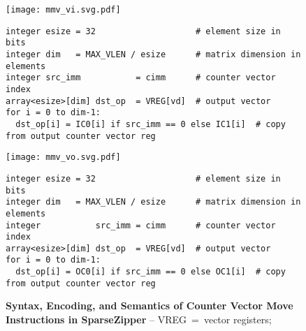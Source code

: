 \lstset{style=python-style}

\begin{figure*}[tp]
\centering


\texttt{[image: mmv\_vi.svg.pdf]}
\begin{lstlisting}[xleftmargin=0.025\tw]
integer esize = 32                    # element size in bits
integer dim   = MAX_VLEN / esize      # matrix dimension in elements
integer src_imm           = cimm      # counter vector index
array<esize>[dim] dst_op  = VREG[vd]  # output vector
for i = 0 to dim-1:
  dst_op[i] = IC0[i] if src_imm == 0 else IC1[i]  # copy from output counter vector reg
\end{lstlisting}


\texttt{[image: mmv\_vo.svg.pdf]}
\begin{lstlisting}[xleftmargin=0.025\tw]
integer esize = 32                    # element size in bits
integer dim   = MAX_VLEN / esize      # matrix dimension in elements
integer           src_imm = cimm      # counter vector index
array<esize>[dim] dst_op  = VREG[vd]  # output vector
for i = 0 to dim-1:
  dst_op[i] = OC0[i] if src_imm == 0 else OC1[i]  # copy from output counter vector reg
\end{lstlisting}

\caption[Counter Vector Move Instructions in SparseZipper]{
  \textbf{Syntax, Encoding, and Semantics of Counter Vector Move Instructions in SparseZipper} --
  VREG~=~vector registers;
}
\label{fig:spz-mtx-mv-insts}
\end{figure*}
